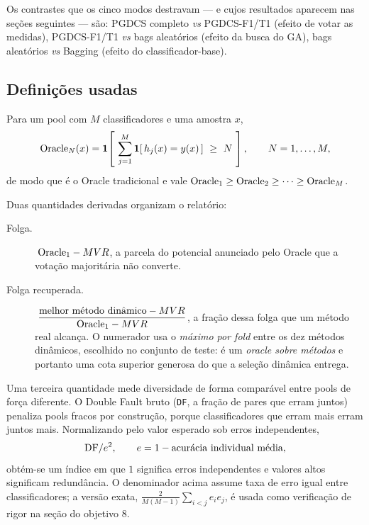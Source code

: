 Os contrastes que os cinco modos destravam --- e cujos resultados aparecem nas
seções seguintes --- são: PGDCS completo \emph{vs} PGDCS-F1/T1 (efeito de votar as
medidas), PGDCS-F1/T1 \emph{vs} bags aleatórios (efeito da busca do GA), bags
aleatórios \emph{vs} Bagging (efeito do classificador-base).

\subsection{Definições usadas}

Para um pool com $M$ classificadores e uma amostra $x$,
\begin{equation}
\On{N}(x) = \mathbf{1}\!\left[\ \sum_{j=1}^{M} \mathbf{1}[\,h_j(x)=y(x)\,] \ \ge\ N \ \right],
\qquad N = 1,\dots,M ,
\end{equation}
de modo que  é o Oracle tradicional e vale
$\text{Oracle}_{1}\ge\text{Oracle}_{2}\ge\dots\ge\text{Oracle}_{M}$.

Duas quantidades derivadas organizam o relatório:

\begin{description}
\item[Folga.] $\;\text{Oracle}_{1}-MVR$, a parcela do potencial anunciado pelo Oracle que a
votação majoritária não converte.

\item[Folga recuperada.] $\;\dfrac{\text{melhor método dinâmico}-MVR}{\text{Oracle}_{1}-MVR}$,
a fração dessa folga que um método real alcança. O numerador usa o \emph{máximo por
fold} entre os dez métodos dinâmicos, escolhido no conjunto de teste: é um
\emph{oracle sobre métodos} e portanto uma cota superior generosa do que a seleção
dinâmica entrega.
\end{description}

Uma terceira quantidade mede diversidade de forma comparável entre pools de força
diferente. O Double Fault bruto (\texttt{DF}, a fração de pares que erram juntos)
penaliza pools fracos por construção, porque classificadores que erram mais erram
juntos mais. Normalizando pelo valor esperado sob erros independentes,
\begin{equation}
\mathrm{DF}/e^{2}, \qquad e = 1 - \text{acurácia individual média},
\end{equation}
obtém-se um índice em que $1$ significa erros independentes e valores altos
significam redundância. O denominador acima assume taxa de erro igual entre
classificadores; a versão exata, $\frac{2}{M(M-1)}\sum_{i<j}e_ie_j$, é usada como
verificação de rigor na seção do objetivo 8.
